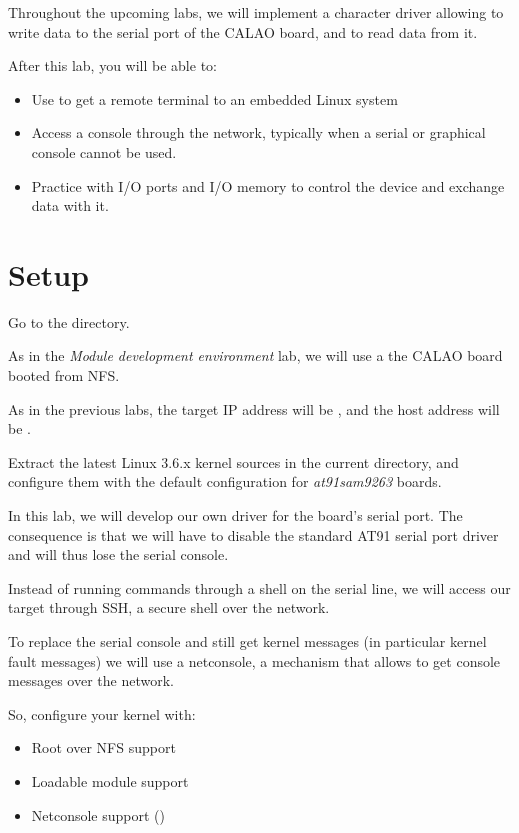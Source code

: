
Throughout the upcoming labs, we will implement a character driver
allowing to write data to the serial port of the CALAO board, and to
read data from it.

After this lab, you will be able to:

\begin{itemize}

\item Use  to get a remote terminal to an embedded Linux
  system

\item Access a console through the network, typically when a serial or
  graphical console cannot be used.

\item Practice with I/O ports and I/O memory to control the device and
  exchange data with it.

\end{itemize}

\section{Setup}

Go to the  directory.

As in the {\em Module development environment} lab, we will use a the
CALAO board booted from NFS.

As in the previous labs, the target IP address will be ,
and the host address will be .

Extract the latest Linux 3.6.x kernel sources in the current
directory, and configure them with the default configuration for
{\em at91sam9263} boards.

In this lab, we will develop our own driver for the board's serial
port. The consequence is that we will have to disable the standard
AT91 serial port driver and will thus lose the serial console.

Instead of running commands through a shell on the serial line, we
will access our target through SSH, a secure shell over the network.

To replace the serial console and still get kernel messages (in
particular kernel fault messages) we will use a netconsole, a
mechanism that allows to get console messages over the network.

So, configure your kernel with:
\begin{itemize}
\item Root over NFS support
\item Loadable module support
\item Netconsole support ()
\end{itemize}

